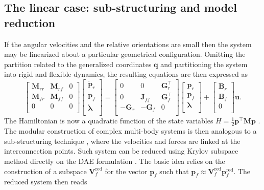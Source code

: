 \documentclass{svjour3}                     %
\begin{document}
\subsection{The linear case: sub-structuring and model reduction}
If the angular velocities and the relative orientations are small then the system may be linearized about a particular geometrical configuration. Omitting the partition related to the generalized coordinates $\mathbf{q}$ and partitioning the system into rigid and flexible dynamics, the resulting equations are then expressed as 
\begin{equation}
\label{eq:mbd_linear}
\begin{bmatrix}
\mathbf{M}_{rr} & \mathbf{M}_{rf} & 0 \\ 
\mathbf{M}_{fr} & \mathbf{M}_{ff} & 0 \\
0 & 0 & 0 \\
\end{bmatrix}
\begin{bmatrix}
\dot{\mathbf{p}}_r \\ \dot{\mathbf{p}}_f \\ \dot{\bm{\lambda}} \\ 
\end{bmatrix} = 
\begin{bmatrix}
0 & 0 & \mathbf{G}_r^\top \\ 
0 & \mathbf{J}_{ff} & \mathbf{G}_f^\top \\ 
-\mathbf{G}_r & -\mathbf{G}_f & 0 \\
\end{bmatrix}
\begin{bmatrix}
\mathbf{p}_r \\ \mathbf{p}_f \\ {\bm{\lambda}} \\ 
\end{bmatrix} + 
\begin{bmatrix}
\mathbf{B}_r \\ \mathbf{B}_f \\ 0 \\
\end{bmatrix}\mathbf{u}.
\end{equation}
The Hamiltonian is now a quadratic function of the state variables $H = \frac{1}{2} \mathbf{p}^\top\mathbf{M}\mathbf{p}$ \cite{beattie2018linear}.
The modular construction of complex multi-body systems is then analogous to a sub-structuring technique \cite{substructuring}, where the velocities and forces are linked at the interconnection points. Such system can be reduced using Krylov subspace method directly on the DAE formulation \cite{phdae_red}. The basic idea relies on the construction of a subspace $\mathbf{V}_f^{\text{red}}$ for the vector $\mathbf{p}_f$ such that $\mathbf{p}_f \approx \mathbf{V}_f^{\text{red}} \mathbf{p}_f^{\text{red}}$. The reduced system then reads
\end{document}

